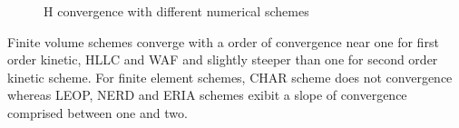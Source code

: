 \begin{figure}[H]
\begin{minipage}[t]{0.50\textwidth}
 \centering
\end{minipage}%
\begin{minipage}[t]{0.50\textwidth}
 \centering
\end{minipage}
\begin{minipage}[t]{0.50\textwidth}
 \centering
\end{minipage}%
\begin{minipage}[t]{0.50\textwidth}
 \centering
\end{minipage}
\begin{minipage}[t]{0.50\textwidth}
 \centering
\end{minipage}%
\begin{minipage}[t]{0.50\textwidth}
 \centering
\end{minipage}
\begin{minipage}[t]{0.50\textwidth}
 \centering
\end{minipage}%
\begin{minipage}[t]{0.50\textwidth}
 \centering
\end{minipage}
  \caption{H convergence with different numerical schemes}
 \label{t2d:thacker:mesh_convergence_H}
\end{figure}

Finite volume schemes converge with a order of convergence near one for
first order kinetic, HLLC and WAF and slightly steeper than one for second order kinetic scheme.
For finite element schemes, CHAR scheme does not convergence whereas LEOP, NERD and ERIA schemes
exibit a slope of convergence comprised between one and two.

